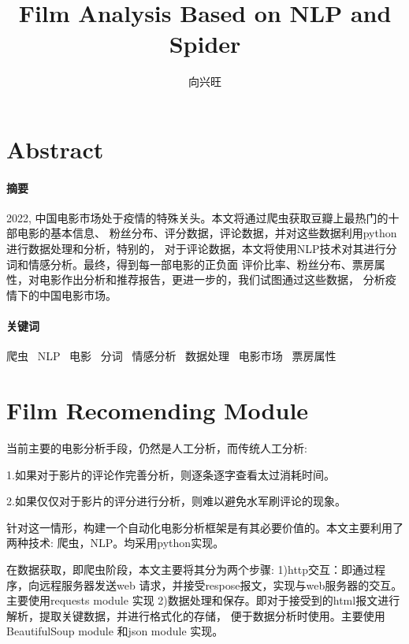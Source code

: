 \documentclass[12pt]{article}
\title{Film Analysis Based on NLP and Spider}
\author{向兴旺}
\begin{document}
\maketitle
\section{Abstract}

\paragraph{摘\quad 要}
2022, 中国电影市场处于疫情的特殊关头。本文将通过爬虫获取豆瓣上最热门的十部电影的基本信息、
粉丝分布、评分数据，评论数据，并对这些数据利用python进行数据处理和分析，特别的，
对于评论数据，本文将使用NLP技术对其进行分词和情感分析。最终，得到每一部电影的正负面
评价比率、粉丝分布、票房属性，对电影作出分析和推荐报告，更进一步的，我们试图通过这些数据，
分析疫情下的中国电影市场。
\paragraph{关键词}
爬虫 \, NLP \, 电影 \, 分词 \, 情感分析 \,  数据处理 \, 电影市场 \, 票房属性

\section{Film Recomending Module}
当前主要的电影分析手段，仍然是人工分析，而传统人工分析:
\par
1.如果对于影片的评论作完善分析，则逐条逐字查看太过消耗时间。
\par
2.如果仅仅对于影片的评分进行分析，则难以避免水军刷评论的现象。
\par
针对这一情形，构建一个自动化电影分析框架是有其必要价值的。本文主要利用了两种技术:
爬虫，NLP。均采用python实现。
\\
\par
在数据获取，即爬虫阶段，本文主要将其分为两个步骤: 1)http交互：即通过程序，向远程服务器发送web
请求，并接受respose报文，实现与web服务器的交互。主要使用requests module 实现
2)数据处理和保存。即对于接受到的html报文进行解析，提取关键数据，并进行格式化的存储，
便于数据分析时使用。主要使用BeautifulSoup module 和json module 实现。
\end{document}
